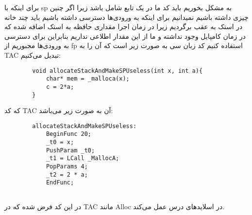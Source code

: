 
برای اینکه با sp به مشکل بخوریم باید کد ما در یک تابع شامل  باشد زیرا اگر چنین چیزی داشته باشیم نمیدانیم برای اینکه به ورودی‌ها دسترسی داشته باشیم باید چند خانه در استک به عقب برگردیم زیرا در زمان اجرا مقداری حافظه به استک اضافه شده که در زمان کامپایل وجود نداشته و ما از این مقدار اطلاعی نداریم بنابراین برای دسترسی به ورودی‌ها مجبوریم از fp استفاده کنیم کد زبان سی به صورت زیر است که آن را به TAC تبدیل می‌کنیم:
\begin{latin}
	\begin{verbatim}
		void allocateStackAndMakeSPUseless(int x, int a){
		    char* mem = _malloca(x);
		    c = 2*a;
		}
	\end{verbatim}
\end{latin}
که کد TAC آن به صورت زیر می‌باشد:
\begin{latin}
	\begin{verbatim}
		allocateStackAndMakeSPUseless:
		    BeginFunc 20;
		    _t0 = x;
		    PushParam _t0;
		    _t1 = LCall _MallocA;
		    PopParams 4;
		    _t2 = 2 * a;
		    EndFunc;
			
	\end{verbatim}
\end{latin}
در این کد فرض شده که  در TAC مانند Alloc در اسلاید‌های درس عمل می‌کند.